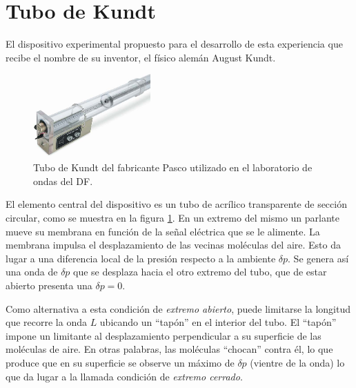 \documentclass[laboratorio]{guia}
\begin{document}
 
\maketitle

\section{Tubo de Kundt}
El dispositivo experimental propuesto para el desarrollo de esta experiencia que recibe el nombre de su inventor, el físico alemán August Kundt.
\begin{figure}[htb]
    \centering
    \includegraphics[width=0.4\textwidth]{pascoKundt}
    \caption{Tubo de Kundt del fabricante Pasco utilizado en el laboratorio de ondas del DF.}
    \label{fig:1}
\end{figure}
El elemento central del dispositivo es un tubo de acrílico transparente de sección circular, como se muestra en la figura \ref{fig:1}.
En un extremo del mismo un parlante mueve su membrana en función de la señal eléctrica que se le alimente.
La membrana impulsa el desplazamiento de las vecinas moléculas del aire.
Esto da lugar a una diferencia local de la presión respecto a la ambiente \(\delta p\).
Se genera así una onda de \(\delta p\) que se desplaza hacia el otro extremo del tubo, que de estar abierto presenta una \(\delta p = 0\).

Como alternativa a esta condición de \emph{extremo abierto}, puede limitarse la longitud que recorre la onda \(L\) ubicando un ``tapón'' en el interior del tubo.
El ``tapón'' impone un limitante al desplazamiento perpendicular a su superficie de las moléculas de aire.
En otras palabras, las moléculas ``chocan'' contra él, lo que produce que en su superficie se observe un máximo de \(\delta p\) (vientre de la onda) lo que da lugar a la llamada condición de \emph{extremo cerrado}.
\end{document}
